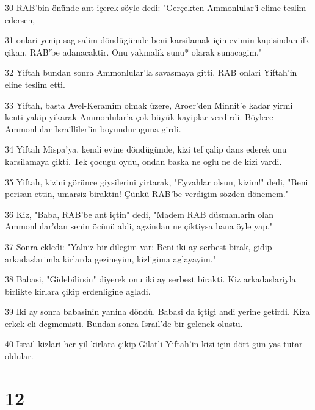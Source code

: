 \par 30 RAB'bin önünde ant içerek söyle dedi: "Gerçekten Ammonlular'i elime teslim edersen,
\par 31 onlari yenip sag salim döndügümde beni karsilamak için evimin kapisindan ilk çikan, RAB'be adanacaktir. Onu yakmalik sunu* olarak sunacagim."
\par 32 Yiftah bundan sonra Ammonlular'la savasmaya gitti. RAB onlari Yiftah'in eline teslim etti.
\par 33 Yiftah, basta Avel-Keramim olmak üzere, Aroer'den Minnit'e kadar yirmi kenti yakip yikarak Ammonlular'a çok büyük kayiplar verdirdi. Böylece Ammonlular Israilliler'in boyunduruguna girdi.
\par 34 Yiftah Mispa'ya, kendi evine döndügünde, kizi tef çalip dans ederek onu karsilamaya çikti. Tek çocugu oydu, ondan baska ne oglu ne de kizi vardi.
\par 35 Yiftah, kizini görünce giysilerini yirtarak, "Eyvahlar olsun, kizim!" dedi, "Beni perisan ettin, umarsiz biraktin! Çünkü RAB'be verdigim sözden dönemem."
\par 36 Kiz, "Baba, RAB'be ant içtin" dedi, "Madem RAB düsmanlarin olan Ammonlular'dan senin öcünü aldi, agzindan ne çiktiysa bana öyle yap."
\par 37 Sonra ekledi: "Yalniz bir dilegim var: Beni iki ay serbest birak, gidip arkadaslarimla kirlarda gezineyim, kizligima aglayayim."
\par 38 Babasi, "Gidebilirsin" diyerek onu iki ay serbest birakti. Kiz arkadaslariyla birlikte kirlara çikip erdenligine agladi.
\par 39 Iki ay sonra babasinin yanina döndü. Babasi da içtigi andi yerine getirdi. Kiza erkek eli degmemisti. Bundan sonra Israil'de bir gelenek olustu.
\par 40 Israil kizlari her yil kirlara çikip Gilatli Yiftah'in kizi için dört gün yas tutar oldular.

\chapter{12}

